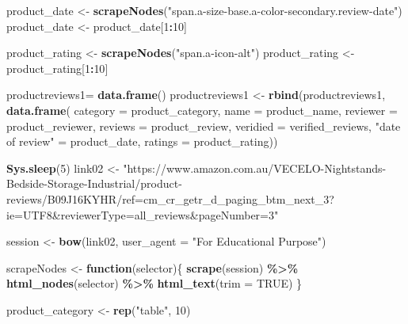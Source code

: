\documentclass[
]{article}
\newenvironment{Shaded}{\begin{snugshade}}{\end{snugshade}}
\newcommand{\AttributeTok}[1]{\textcolor[rgb]{0.13,0.29,0.53}{#1}}
\newcommand{\ConstantTok}[1]{\textcolor[rgb]{0.56,0.35,0.01}{#1}}
\newcommand{\ControlFlowTok}[1]{\textcolor[rgb]{0.13,0.29,0.53}{\textbf{#1}}}
\newcommand{\DecValTok}[1]{\textcolor[rgb]{0.00,0.00,0.81}{#1}}
\newcommand{\FunctionTok}[1]{\textcolor[rgb]{0.13,0.29,0.53}{\textbf{#1}}}
\newcommand{\NormalTok}[1]{#1}
\newcommand{\OtherTok}[1]{\textcolor[rgb]{0.56,0.35,0.01}{#1}}
\newcommand{\SpecialCharTok}[1]{\textcolor[rgb]{0.81,0.36,0.00}{\textbf{#1}}}
\newcommand{\StringTok}[1]{\textcolor[rgb]{0.31,0.60,0.02}{#1}}
\begin{document}
\begin{Shaded}
\begin{Highlighting}[]
\NormalTok{  product\_date }\OtherTok{\textless{}{-}} \FunctionTok{scrapeNodes}\NormalTok{(}\StringTok{"span.a{-}size{-}base.a{-}color{-}secondary.review{-}date"}\NormalTok{)}
\NormalTok{  product\_date }\OtherTok{\textless{}{-}}\NormalTok{ product\_date[}\DecValTok{1}\SpecialCharTok{:}\DecValTok{10}\NormalTok{]}
  
\NormalTok{  product\_rating }\OtherTok{\textless{}{-}} \FunctionTok{scrapeNodes}\NormalTok{(}\StringTok{"span.a{-}icon{-}alt"}\NormalTok{)}
\NormalTok{  product\_rating }\OtherTok{\textless{}{-}}\NormalTok{ product\_rating[}\DecValTok{1}\SpecialCharTok{:}\DecValTok{10}\NormalTok{]}
  
\NormalTok{  productreviews1}\OtherTok{=} \FunctionTok{data.frame}\NormalTok{()}
\NormalTok{  productreviews1 }\OtherTok{\textless{}{-}} \FunctionTok{rbind}\NormalTok{(productreviews1, }\FunctionTok{data.frame}\NormalTok{(}
                      \AttributeTok{category =}\NormalTok{ product\_category,}
                      \AttributeTok{name =}\NormalTok{ product\_name,}
                      \AttributeTok{reviewer =}\NormalTok{ product\_reviewer,}
                      \AttributeTok{reviews =}\NormalTok{ product\_review,}
                      \AttributeTok{veridied =}\NormalTok{ verified\_reviews,}
                      \StringTok{"date of review"} \OtherTok{=}\NormalTok{ product\_date,}
                      \AttributeTok{ratings =}\NormalTok{ product\_rating))}

  
 \FunctionTok{Sys.sleep}\NormalTok{(}\DecValTok{5}\NormalTok{)}
\NormalTok{link02 }\OtherTok{\textless{}{-}} \StringTok{"https://www.amazon.com.au/VECELO{-}Nightstands{-}Bedside{-}Storage{-}Industrial/product{-}reviews/B09J16KYHR/ref=cm\_cr\_getr\_d\_paging\_btm\_next\_3?ie=UTF8\&reviewerType=all\_reviews\&pageNumber=3"}


\NormalTok{  session }\OtherTok{\textless{}{-}} \FunctionTok{bow}\NormalTok{(link02,}
               \AttributeTok{user\_agent =} \StringTok{"For Educational Purpose"}\NormalTok{)}

\NormalTok{  scrapeNodes }\OtherTok{\textless{}{-}} \ControlFlowTok{function}\NormalTok{(selector)\{}
    \FunctionTok{scrape}\NormalTok{(session) }\SpecialCharTok{\%\textgreater{}\%}
      \FunctionTok{html\_nodes}\NormalTok{(selector) }\SpecialCharTok{\%\textgreater{}\%}
      \FunctionTok{html\_text}\NormalTok{(}\AttributeTok{trim =} \ConstantTok{TRUE}\NormalTok{)}
\NormalTok{  \}}

\NormalTok{  product\_category }\OtherTok{\textless{}{-}} \FunctionTok{rep}\NormalTok{(}\StringTok{"table"}\NormalTok{, }\DecValTok{10}\NormalTok{)}


\end{Highlighting}
\end{Shaded}
\end{document}
